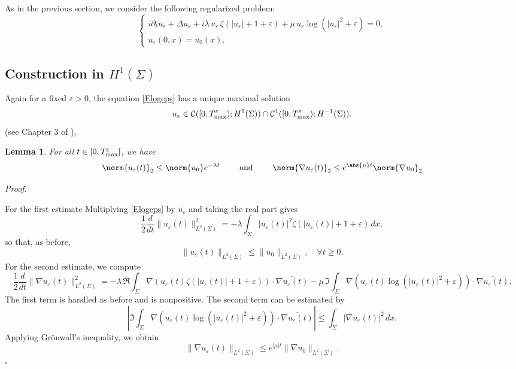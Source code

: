 \documentclass[10pt]{article}
\newtheorem{lemma}[theorem]{Lemma}
\renewenvironment{proof}[1][Proof]{%
  \noindent\textit{#1. }%
}{\hfill$\square$\vspace{4pt}}
\begin{document}
As in the previous section, we consider the following regularized problem:
\begin{equation}\tag{logNLS-$\zeta_\varepsilon$}\label{Elogeps}
\begin{cases}
i \partial_t u_\varepsilon + \Delta u_\varepsilon
+ i \lambda\, u_\varepsilon\, \zeta(|u_\varepsilon| + 1 + \varepsilon)
+ \mu\, u_\varepsilon \log(|u_\varepsilon|^2 + \varepsilon) = 0, \\[0.3em]
u_\varepsilon(0,x) = u_0(x).
\end{cases}
\end{equation}


\subsection{Construction in \texorpdfstring{$H^1(\Sigma)$}{H1(Sigma)}}
Again for a fixed $\varepsilon > 0$, the equation \eqref{Elogeps} has a unique maximal solution \[
u_\varepsilon \in \mathcal{C}([0,T_{\rm max}^{\varepsilon}); H^1(\Sigma)) \cap \mathcal{C}^1([0,T_{\rm max}^{\varepsilon}); H^{-1}(\Sigma)).
\] (see Chapter 3 of \cite{2}),
\begin{lemma}
    For all $t\in [0,T_{\rm max}^{\varepsilon}[$, we have
    $$\norm{u_\varepsilon(t)}_2\leq \norm{u_0}e^{-\lambda t} \qquad \text{ and } \qquad \norm{\nabla u_\varepsilon(t)}_2\leq e^{\abs{\mu}t}\norm{\nabla u_0}_2$$
\end{lemma}
\begin{proof}
    For the first estimate Multiplying \eqref{Elogeps} by $\overline{u_\varepsilon}$ and taking the real part gives
\[
\frac{1}{2}\frac{d}{dt}\|u_\varepsilon(t)\|_{L^2(\Sigma)}^2
= -\lambda \int_\Sigma |u_\varepsilon(t)|^2 \zeta(|u_\varepsilon(t)|+1+\varepsilon)\,dx,
\]
so that, as before,
\begin{equation}\label{L2boundlog}
\|u_\varepsilon(t)\|_{L^2(\Sigma)} \le \|u_0\|_{L^2(\Sigma)}, \quad \forall t\ge0.
\end{equation}
For the second estimate, we compute
\[
\frac{1}{2}\frac{d}{dt}\|\nabla u_\varepsilon(t)\|_{L^2(\Sigma)}^2
= -\lambda\,\Re \int_\Sigma \nabla(u_\varepsilon(t)\zeta(|u_\varepsilon(t)|+1+\varepsilon)) \cdot \overline{\nabla u_\varepsilon(t)}
    - \mu\,\Im \int_\Sigma \nabla(u_\varepsilon(t)\log(|u_\varepsilon(t)|^2+\varepsilon)) \cdot \overline{\nabla u_\varepsilon(t)}.
\]
The first term is handled as before and is nonpositive.  
The second term can be estimated by
\[
\left|\Im \int_\Sigma \nabla(u_\varepsilon(t)\log(|u_\varepsilon(t)|^2+\varepsilon)) \cdot \overline{\nabla u_\varepsilon(t)}\right|
\le \int_\Sigma |\nabla u_\varepsilon(t)|^2\,dx.
\]
Applying Grönwall’s inequality, we obtain
\begin{equation}\label{gradboundlog}
\|\nabla u_\varepsilon(t)\|_{L^2(\Sigma)} \le e^{|\mu| t} \|\nabla u_0\|_{L^2(\Sigma)}.
\end{equation}
\end{proof}
\end{document}
